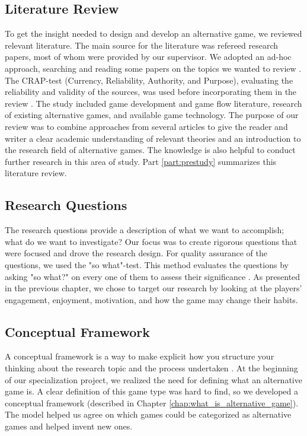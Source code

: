 \subsection{Literature Review}
To get the insight needed to design and develop an alternative game, we reviewed relevant literature. The main source for the literature was refereed research papers, most of whom were provided by our supervisor. We adopted an ad-hoc approach, searching and reading some papers on the topics we wanted to review \citep{farshchian_introduction_2020}. The CRAP-test (Currency, Reliability, Authority, and Purpose), evaluating the reliability and validity of the sources, was used before incorporating them in the review \citep{farshchian_searching_2020}. The study included game development and game flow literature, research of existing alternative games, and available game technology. The purpose of our review was to combine approaches from several articles to give the reader and writer a clear academic understanding of relevant theories and an introduction to the research field of alternative games. The knowledge is also helpful to conduct further research in this area of study. Part \ref{part:prestudy} summarizes this literature review.

\subsection{Research Questions}
The research questions provide a description of what we want to accomplish; what do we want to investigate? Our focus was to create rigorous questions that were focused and drove the research design. For quality assurance of the questions, we used the "so what"-test. This method evaluates the questions by asking "so what?" on every one of them to assess their significance \citep{farshchian_generating_2020}. As presented in the previous chapter, we chose to target our research by looking at the players’ engagement, enjoyment, motivation, and how the game may change their habits.

\subsection{Conceptual Framework}
A conceptual framework is a way to make explicit how you structure your thinking about the research topic and the process undertaken \citep{oates_researching_2006}. At the beginning of our specialization project, we realized the need for defining what an alternative game is. A clear definition of this game type was hard to find, so we developed a conceptual framework (described in Chapter \ref{chap:what_is_alternative_game}). The model helped us agree on which games could be categorized as alternative games and helped invent new ones.

